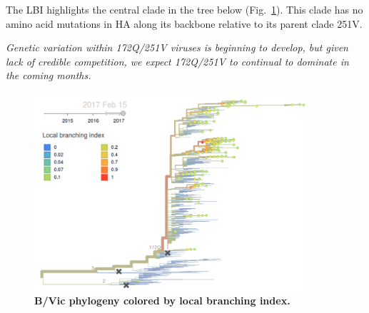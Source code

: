 \documentclass[11pt,oneside,letterpaper]{article}
\begin{document}
\pagebreak

The LBI highlights the central clade in the tree below (Fig.\ \ref{Yam_lbi}). This clade has no amino acid mutations in HA along its backbone relative to its parent clade 251V.

\textit{Genetic variation within 172Q/251V viruses is beginning to develop, but given lack of credible competition, we expect 172Q/251V to continual to dominate in the coming months.}

\begin{figure}[H]
	\centering
	\includegraphics[width=0.9\textwidth]{../figures/feb-2017/yam_lbi.png}
	\caption{\textbf{B/Vic phylogeny colored by local branching index.}
	}
	\label{Yam_lbi}
\end{figure}

\clearpage
\pagebreak



\end{document}
